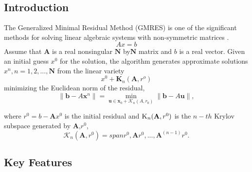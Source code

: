 \documentclass[12pt]{article}
\begin{document}
\subsection{Introduction}
The Generalized Minimal Residual Method (GMRES) is one of the significant methods for solving linear algebraic systems with non-symmetric matrices .  \\
\begin{equation}
    Ax=b
\end{equation}
Assume that $\textbf{A}$ is a real nonsingular $\textbf{N}$ by$\textbf{N}$ matrix and $b$ is a real vector. Given an initial guess $x^0$ for the solution, the algorithm generates approximate solutions $x^n,n=1,2,...,\textbf{N}$ from the linear variety
\begin{equation}
    x^0+\textbf{K}_n(\textbf{A},r^o)
\end{equation}
minimizing the Euclidean norm of the residual,
\begin{equation}
    \| \mathbf{b} - A\mathbf{x}^n \| = \min_{\mathbf{u} \in \mathbf{x}_0 + \mathcal{K}_n(A,r_0)} \| \mathbf{b} - A\mathbf{u} \|,
\end{equation}

where $r^0=b-\textbf{A}x^0$ is the initial residual and $\textsc{K}_n(\textbf{A},r^0)$ is the $n-th$ Krylov subspace generated by \textbf{A},$r^0$,
\begin{equation}
    \mathcal{K}_n(\mathbf{A},r^0)=span{r^0,\mathbf{A}r^0,...,\mathbf{A}^(n-1)r^0}.
\end{equation}


\subsection{Key Features}



%
\end{document}
